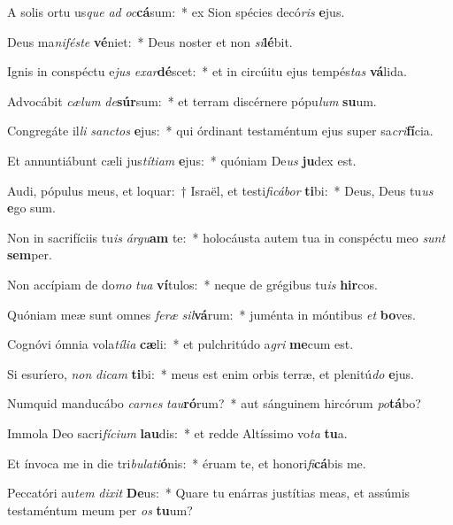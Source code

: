 \item A solis ortu us\textit{que} \textit{ad} \textit{oc}\textbf{cá}sum:~* ex Sion spécies decó\textit{ris} \textbf{e}jus.
\item Deus ma\textit{ni}\textit{fés}\textit{te} \textbf{vé}niet:~* Deus noster et non \textit{si}\textbf{lé}bit.
\item Ignis in conspéctu e\textit{jus} \textit{ex}\textit{ar}\textbf{dé}scet:~* et in circúitu ejus tempés\textit{tas} \textbf{vá}lida.
\item Advocábit \textit{cæ}\textit{lum} \textit{de}\textbf{súr}sum:~* et terram discérnere pópu\textit{lum} \textbf{su}um.
\item Congregáte il\textit{li} \textit{sanc}\textit{tos} \textbf{e}jus:~* qui órdinant testaméntum ejus super sa\textit{cri}\textbf{fí}cia.
\item Et annuntiábunt cæli jus\textit{tí}\textit{ti}\textit{am} \textbf{e}jus:~* quóniam De\textit{us} \textbf{ju}dex est.
\item Audi, pópulus meus, et loquar:~† Israël, et testi\textit{fi}\textit{cá}\textit{bor} \textbf{ti}bi:~* Deus, Deus tu\textit{us} \textbf{e}go sum.
\item Non in sacrifíciis tu\textit{is} \textit{ár}\textit{gu}\textbf{am} te:~* holocáusta autem tua in conspéctu meo \textit{sunt} \textbf{sem}per.
\item Non accípiam de do\textit{mo} \textit{tu}\textit{a} \textbf{ví}tulos:~* neque de grégibus tu\textit{is} \textbf{hir}cos.
\item Quóniam meæ sunt omnes \textit{fe}\textit{ræ} \textit{sil}\textbf{vá}rum:~* juménta in móntibus \textit{et} \textbf{bo}ves.
\item Cognóvi ómnia vola\textit{tí}\textit{li}\textit{a} \textbf{cæ}li:~* et pulchritúdo a\textit{gri} \textbf{me}cum est.
\item Si esuríero, \textit{non} \textit{di}\textit{cam} \textbf{ti}bi:~* meus est enim orbis terræ, et plenitú\textit{do} \textbf{e}jus.
\item Numquid manducábo \textit{car}\textit{nes} \textit{tau}\textbf{ró}rum?~* aut sánguinem hircórum \textit{po}\textbf{tá}bo?
\item Immola Deo sacri\textit{fí}\textit{ci}\textit{um} \textbf{lau}dis:~* et redde Altíssimo vo\textit{ta} \textbf{tu}a.
\item Et ínvoca me in die tri\textit{bu}\textit{la}\textit{ti}\textbf{ó}nis:~* éruam te, et honori\textit{fi}\textbf{cá}bis me.
\item Peccatóri au\textit{tem} \textit{di}\textit{xit} \textbf{De}us:~* Quare tu enárras justítias meas, et assúmis testaméntum meum per \textit{os} \textbf{tu}um?
